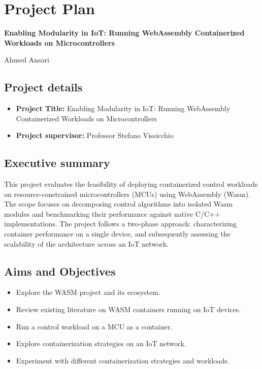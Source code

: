 \documentclass[12pt, a4paper]{report}
\begin{document}
\chapter{Project Plan}

\begin{center}
{\Large\bfseries Enabling Modularity in IoT: Running WebAssembly Containerized Workloads on Microcontrollers}

\vspace{0.5em}
Ahmed Ansari
\end{center}

\section*{Project details}
\begin{itemize}
    \item \textbf{Project Title:} Enabling Modularity in IoT: Running WebAssembly Containerized Workloads on Microcontrollers
    \item \textbf{Project supervisor:} Professor Stefano Vissicchio
\end{itemize}

\section*{Executive summary}
This project evaluates the feasibility of deploying containerized control workloads on resource-constrained microcontrollers (MCUs) using WebAssembly (Wasm). The scope focuses on decomposing control algorithms into isolated Wasm modules and benchmarking their performance against native C/C++ implementations. The project follows a two-phase approach: characterizing container performance on a single device, and subsequently assessing the scalability of the architecture across an IoT network.

\section*{Aims and Objectives}
\begin{itemize}
    \item Explore the WASM project and its ecosystem.
    \item Review existing literature on WASM containers running on IoT devices.
    \item Run a control workload on a MCU as a container.
    \item Explore containerization strategies on an IoT network.
    \item Experiment with different containerization strategies and workloads.
\end{itemize}
\end{document}
